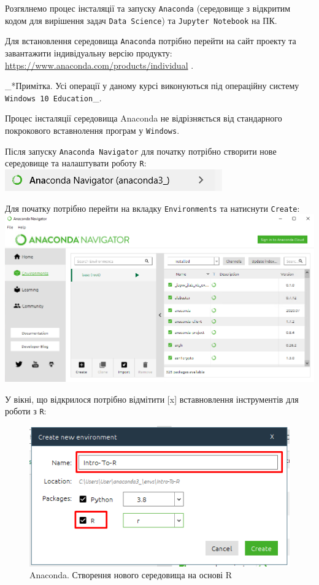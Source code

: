 \documentclass[
]{book}
\begin{document}
Розгялнемо процес інсталяції та запуску \texttt{Anaconda} (середовище з відкритим кодом для вирішення задач \texttt{Data\ Science}) та \texttt{Jupyter\ Notebook} на ПК.

Для встановлення середовища \texttt{Anaconda} потрібно перейти на сайт проекту та завантажити індивідуальну версію продукту: \url{https://www.anaconda.com/products/individual} \citep{Anaconda-site}.

\_*Примітка. Усі операції у даному курсі виконуються під операційну систему \texttt{Windows\ 10\ Education}\_.

Процес інсталяції середовища Anaconda не відрізняється від стандарного покрокового вставнолення програм у \texttt{Windows}.

Після запуску \texttt{Anaconda\ Navigator} для початку потрібно створити нове середовище та налаштувати роботу \texttt{R}:
\includegraphics{images/chapter1/anaconda_1.png}

Для початку потрібно перейти на вкладку \texttt{Environments} та натиснути \texttt{Create}:
\includegraphics{images/chapter1/anaconda_2.png}

У вікні, що відкрилося потрібно відмітити {[}x{]} вставновлення інструментів для роботи з \texttt{R}:

\begin{figure}
\centering
\includegraphics{images/chapter1/anaconda_3.png}
\caption{\label{fig:unnamed-chunk-25}Anaconda. Створення нового середовища на основі R}
\end{figure}
\end{document}
